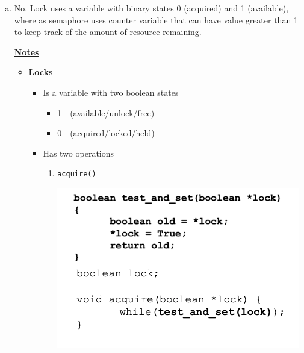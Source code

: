 \documentclass[12pt]{article}
\begin{document}
\begin{enumerate}[1.]
\begin{enumerate}[a)]
        \item

        No. Lock uses a variable with binary states 0 (acquired) and 1 (available), where as
        semaphore uses counter variable that can have value greater than 1 to
        keep track of the amount of resource remaining.

        \bigskip

        \underline{\textbf{Notes}}

        \begin{itemize}
            \item \textbf{Locks}

            \begin{itemize}
                \item Is a variable with two boolean states

                \begin{itemize}
                    \item 1 - (available/unlock/free)
                    \item 0 - (acquired/locked/held)
                \end{itemize}

                \item Has two operations

                \begin{enumerate}[1.]
                    \item \texttt{acquire()}

                    \bigskip

                    \begin{center}
                    \includegraphics[width=0.7\linewidth]{images/midterm_1_solution_4.png}
                    \end{center}

                    \bigskip


\end{enumerate}
\end{itemize}
\end{itemize}
\end{enumerate}
\end{enumerate}
\end{document}
